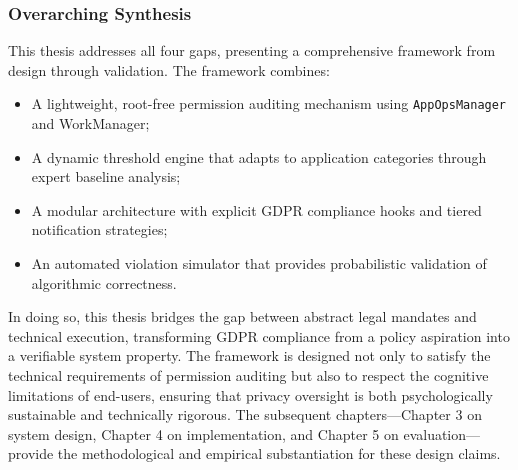 \subsubsection{Overarching Synthesis}
This thesis addresses all four gaps, presenting a comprehensive framework from design through validation. The framework combines:
\begin{itemize}
    \item A lightweight, root-free permission auditing mechanism using \texttt{AppOpsManager} and WorkManager;
    \item A dynamic threshold engine that adapts to application categories through expert baseline analysis;
    \item A modular architecture with explicit GDPR compliance hooks and tiered notification strategies;
    \item An automated violation simulator that provides probabilistic validation of algorithmic correctness.
\end{itemize}

In doing so, this thesis bridges the gap between abstract legal mandates and technical execution, transforming GDPR compliance from a policy aspiration into a verifiable system property. The framework is designed not only to satisfy the technical requirements of permission auditing but also to respect the cognitive limitations of end-users, ensuring that privacy oversight is both psychologically sustainable and technically rigorous. The subsequent chapters—Chapter 3 on system design, Chapter 4 on implementation, and Chapter 5 on evaluation—provide the methodological and empirical substantiation for these design claims.

